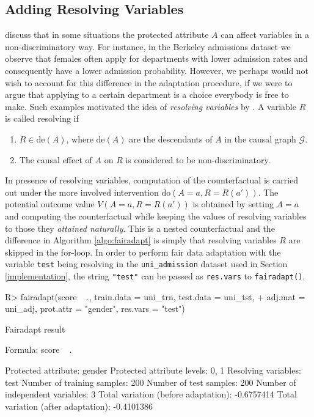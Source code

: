 \documentclass[
  nojss]{jss}
\providecommand{\tightlist}{%
  \setlength{\itemsep}{0pt}\setlength{\parskip}{0pt}}
\begin{document}
\hypertarget{adding-resolving-variables}{%
\subsection{Adding Resolving
Variables}\label{adding-resolving-variables}}

\cite{kilbertus2017avoiding} discuss that in some situations the
protected attribute \(A\) can affect variables in a non-discriminatory
way. For instance, in the Berkeley admissions dataset
\citep{bickel1975sex} we observe that females often apply for
departments with lower admission rates and consequently have a lower
admission probability. However, we perhaps would not wish to account for
this difference in the adaptation procedure, if we were to argue that
applying to a certain department is a choice everybody is free to make.
Such examples motivated the idea of \emph{resolving variables} by
\citet{kilbertus2017avoiding}. A variable \(R\) is called resolving if

\begin{enumerate}
\def\labelenumi{(\roman{enumi})}
\tightlist
\item
  \(R \in \mathrm{de}(A)\), where \(\mathrm{de}(A)\) are the descendants
  of \(A\) in the causal graph \(\mathcal{G}\).
\item
  The causal effect of \(A\) on \(R\) is considered to be
  non-discriminatory.
\end{enumerate}

In presence of resolving variables, computation of the counterfactual is
carried out under the more involved intervention
do\((A = a, R = R(a'))\). The potential outcome value
\(V(A = a, R = R(a'))\) is obtained by setting \(A = a\) and computing
the counterfactual while keeping the values of resolving variables to
those they \emph{attained naturally}. This is a nested counterfactual
and the difference in Algorithm \ref{algo:fairadapt} is simply that
resolving variables \(R\) are skipped in the for-loop. In order to
perform fair data adaptation with the variable \texttt{test} being
resolving in the \texttt{uni\_admission} dataset used in Section
\ref{implementation}, the string \texttt{"test"} can be passed as
\texttt{res.vars} to \texttt{fairadapt()}.

\begin{CodeChunk}
\begin{CodeInput}
R> fairadapt(score ~ ., train.data = uni_trn, test.data = uni_tst,
+           adj.mat = uni_adj, prot.attr = "gender", res.vars = "test")
\end{CodeInput}
\begin{CodeOutput}
Fairadapt result

Formula:
 score ~ . 

Protected attribute:                  gender 
Protected attribute levels:           0, 1 
Resolving variables:                  test 
Number of training samples:           200 
Number of test samples:               200 
Number of independent variables:      3 
Total variation (before adaptation):  -0.6757414 
Total variation (after adaptation):   -0.4101386 
\end{CodeOutput}
\end{CodeChunk}
\end{document}
